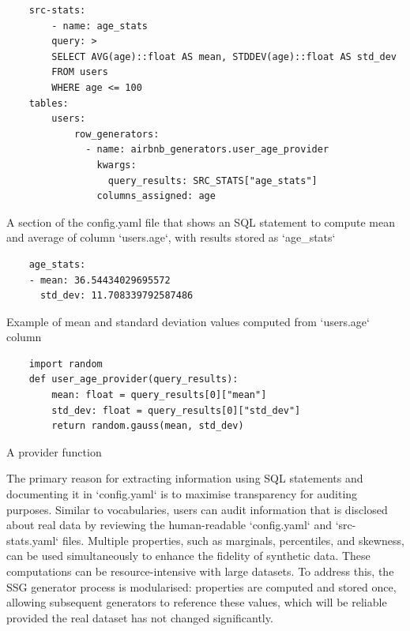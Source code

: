 \documentclass[11pt]{article}
\begin{document}
\begin{listing}[H]
\begin{verbatim}
    src-stats:
        - name: age_stats
        query: >
        SELECT AVG(age)::float AS mean, STDDEV(age)::float AS std_dev
        FROM users
        WHERE age <= 100
    tables:
        users:
            row_generators:
              - name: airbnb_generators.user_age_provider
                kwargs:
                  query_results: SRC_STATS["age_stats"]
                columns_assigned: age
\end{verbatim}
\caption{A section of the config.yaml file that shows an SQL statement to compute mean and average of column `users.age`, with results stored as `age_stats` }
\label{lst:define sql and row generator in config.yaml}
\end{listing}

\begin{listing}[H]
\begin{verbatim}
    age_stats:
    - mean: 36.54434029695572
      std_dev: 11.708339792587486
\end{verbatim}
\caption{Example of mean and standard deviation values computed from `users.age` column}
\label{lst:age_stats src-stats.yaml}
\end{listing}

\begin{listing}[H]
\begin{verbatim}
    import random
    def user_age_provider(query_results):
        mean: float = query_results[0]["mean"]
        std_dev: float = query_results[0]["std_dev"]
        return random.gauss(mean, std_dev)
\end{verbatim} 
\caption{A provider function }
\label{lst:provider-function}
\end{listing}

The primary reason for extracting information using SQL statements and documenting it in `config.yaml` is to maximise transparency for auditing purposes. Similar to vocabularies, users can audit information that is disclosed about real data by reviewing the human-readable `config.yaml` and `src-stats.yaml` files. Multiple properties, such as marginals, percentiles, and skewness, can be used simultaneously to enhance the fidelity of synthetic data. These computations can be resource-intensive with large datasets. To address this, the SSG generator process is modularised: properties are computed and stored once, allowing subsequent generators to  reference these values, which will be reliable provided the real dataset has not changed significantly.
\end{document}
